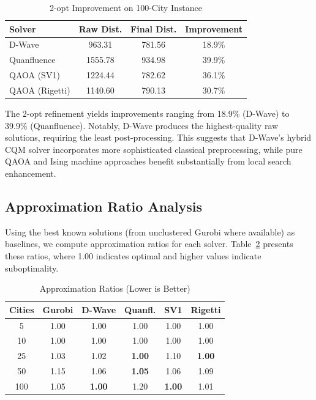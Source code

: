 \documentclass[conference]{IEEEtran}
\begin{document}
\begin{table}[htbp]
\caption{2-opt Improvement on 100-City Instance}
\begin{center}
\begin{tabular}{|l|c|c|c|}
\hline
\textbf{Solver} & \textbf{Raw Dist.} & \textbf{Final Dist.} & \textbf{Improvement} \\
\hline
D-Wave & 963.31 & 781.56 & 18.9\% \\
\hline
Quanfluence & 1555.78 & 934.98 & 39.9\% \\
\hline
QAOA (SV1) & 1224.44 & 782.62 & 36.1\% \\
\hline
QAOA (Rigetti) & 1140.60 & 790.13 & 30.7\% \\
\hline
\end{tabular}
\label{tab:two_opt}
\end{center}
\end{table}

The 2-opt refinement yields improvements ranging from 18.9\% (D-Wave) to 39.9\% (Quanfluence). Notably, D-Wave produces the highest-quality raw solutions, requiring the least post-processing. This suggests that D-Wave's hybrid CQM solver incorporates more sophisticated classical preprocessing, while pure QAOA and Ising machine approaches benefit substantially from local search enhancement.

\subsection{Approximation Ratio Analysis}

Using the best known solutions (from unclustered Gurobi where available) as baselines, we compute approximation ratios for each solver. Table~\ref{tab:approx_ratio} presents these ratios, where 1.00 indicates optimal and higher values indicate suboptimality.

\begin{table}[htbp]
\caption{Approximation Ratios (Lower is Better)}
\begin{center}
\begin{tabular}{|c|c|c|c|c|c|}
\hline
\textbf{Cities} & \textbf{Gurobi} & \textbf{D-Wave} & \textbf{Quanfl.} & \textbf{SV1} & \textbf{Rigetti} \\
\hline
5 & 1.00 & 1.00 & 1.00 & 1.00 & 1.00 \\
\hline
10 & 1.00 & 1.00 & 1.00 & 1.00 & 1.00 \\
\hline
25 & 1.03 & 1.02 & \textbf{1.00} & 1.10 & \textbf{1.00} \\
\hline
50 & 1.15 & 1.06 & \textbf{1.05} & 1.06 & 1.09 \\
\hline
100 & 1.05 & \textbf{1.00} & 1.20 & \textbf{1.00} & 1.01 \\
\hline
\end{tabular}
\label{tab:approx_ratio}
\end{center}
\end{table}
\end{document}
